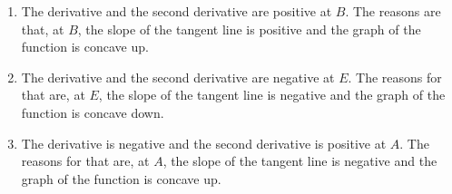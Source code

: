 	\spc
	
	\begin{enumerate}[label=(\alph*)]
	\item The derivative and the second derivative are positive at $B$. The reasons are that, at $B$, the slope of the tangent line is positive and the graph of the function is concave up.
	\item The derivative and the second derivative are negative at $E$. The reasons for that are, at $E$, the slope of the tangent line is negative and the graph of the function is concave down.
	\item The derivative is negative and the second derivative is positive at $A$. The reasons for that are, at $A$, the slope of the tangent line is negative and the graph of the function is concave up.
	\end{enumerate}
		
